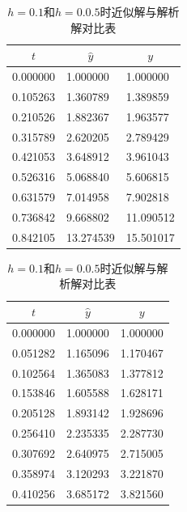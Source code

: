 \begin{table}[H]
	\centering
	\caption{$h=0.1$和$h=0.0.5$时近似解与解析解对比表}
	\begin{tabular}{lll}
		\hline
		\multicolumn{1}{c}{$t$} & \multicolumn{1}{c}{$\hat{y}$} & \multicolumn{1}{c}{$y$} \\ \hline
		0.000000                & 1.000000                      & 1.000000                \\
		0.105263                & 1.360789                      & 1.389859                \\
		0.210526                & 1.882367                      & 1.963577                \\
		0.315789                & 2.620205                      & 2.789429                \\
		0.421053                & 3.648912                      & 3.961043                \\
		0.526316                & 5.068840                      & 5.606815                \\
		0.631579                & 7.014958                      & 7.902818                \\
		0.736842                & 9.668802                      & 11.090512               \\
		0.842105                & 13.274539                     & 15.501017               \\ \hline
	\end{tabular}
	\quad
	\begin{tabular}{lll}
		\hline
		\multicolumn{1}{c}{$t$} & \multicolumn{1}{c}{$\hat{y}$} & \multicolumn{1}{c}{$y$} \\ \hline
		0.000000                & 1.000000                      & 1.000000                \\
		0.051282                & 1.165096                      & 1.170467                \\
		0.102564                & 1.365083                      & 1.377812                \\
		0.153846                & 1.605588                      & 1.628171                \\
		0.205128                & 1.893142                      & 1.928696                \\
		0.256410                & 2.235335                      & 2.287730                \\
		0.307692                & 2.640975                      & 2.715005                \\
		0.358974                & 3.120293                      & 3.221870                \\
		0.410256                & 3.685172                      & 3.821560                \\ \hline
	\end{tabular}
\end{table}

